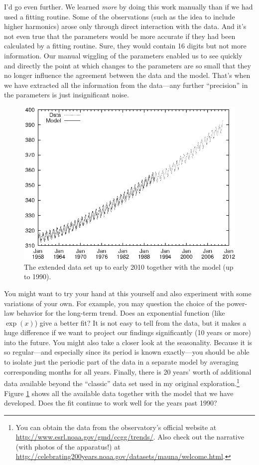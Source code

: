 I'd go even further. We learned \emph{more} by doing this work
manually than if we had used a fitting routine. Some of the
observations (such as the idea to include higher harmonics) arose only
through direct interaction with the data. And it's not even true that
the parameters would be more accurate if they had been calculated by a
fitting routine.  Sure, they would contain 16 digits but not more
information. Our manual wiggling of the parameters enabled us to see
quickly and directly the point at which changes to the parameters are
so small that they no longer influence the agreement between the data
and the model.  That's when we have extracted all the information from
the data---any further ``precision'' in the parameters is just
insignificant noise.

\begin{figure}[t!]
  \centerline{\includegraphics{img/session14}}
  \caption{The extended data set up to early 2010 together with the
    model (up to 1990).}
  \label{fig:session14}
\end{figure}

You might want to try your hand at this yourself and also experiment
with some variations of your own.  For example, you may question the
choice of the power-law behavior for the long-term trend.\vadjust{\pagebreak} 
Does an exponential function (like $\exp(x)$) give a better fit? It is not
easy to tell from the data, but it makes a huge difference if we want
to project our findings significantly (10 years or more) into the
future. You might also take a closer look at the seasonality. Because
it is so regular---and especially since its period is known
exactly---you should be able to isolate just the periodic part of the
data in a separate model by averaging corresponding months for all
years.  Finally, there is 20 years' worth of additional data available
beyond the ``classic'' data set used in my original
exploration.\footnote{You can obtain the data from the observatory's
  official website at
  \url{http://www.esrl.noaa.gov/gmd/}\url{ccgg/trends/}. Also check out the
  narrative (with photos of the apparatus!) at
  \url{http://celebrating200years.noaa.gov/datasets/mauna/welcome.html}.}
Figure \ref{fig:session14} shows all the available data together with
the model that we have developed. Does the fit continue to work well
for the years past 1990?

